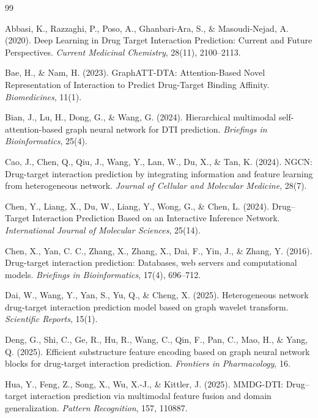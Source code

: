 \documentclass[12pt,a4paper,oneside]{report}
\begin{document}
\begin{thebibliography}{99}

Abbasi, K., Razzaghi, P., Poso, A., Ghanbari-Ara, S., \& Masoudi-Nejad, A. (2020).
Deep Learning in Drug Target Interaction Prediction: Current and Future Perspectives.
\textit{Current Medicinal Chemistry}, 28(11), 2100--2113.

Bae, H., \& Nam, H. (2023).
GraphATT-DTA: Attention-Based Novel Representation of Interaction to Predict Drug-Target Binding Affinity.
\textit{Biomedicines}, 11(1).

Bian, J., Lu, H., Dong, G., \& Wang, G. (2024).
Hierarchical multimodal self-attention-based graph neural network for DTI prediction.
\textit{Briefings in Bioinformatics}, 25(4).

Cao, J., Chen, Q., Qiu, J., Wang, Y., Lan, W., Du, X., \& Tan, K. (2024).
NGCN: Drug-target interaction prediction by integrating information and feature learning from heterogeneous network.
\textit{Journal of Cellular and Molecular Medicine}, 28(7).

Chen, Y., Liang, X., Du, W., Liang, Y., Wong, G., \& Chen, L. (2024).
Drug–Target Interaction Prediction Based on an Interactive Inference Network.
\textit{International Journal of Molecular Sciences}, 25(14).

Chen, X., Yan, C. C., Zhang, X., Zhang, X., Dai, F., Yin, J., \& Zhang, Y. (2016).
Drug-target interaction prediction: Databases, web servers and computational models.
\textit{Briefings in Bioinformatics}, 17(4), 696--712.

Dai, W., Wang, Y., Yan, S., Yu, Q., \& Cheng, X. (2025).
Heterogeneous network drug-target interaction prediction model based on graph wavelet transform.
\textit{Scientific Reports}, 15(1).

Deng, G., Shi, C., Ge, R., Hu, R., Wang, C., Qin, F., Pan, C., Mao, H., \& Yang, Q. (2025).
Efficient substructure feature encoding based on graph neural network blocks for drug-target interaction prediction.
\textit{Frontiers in Pharmacology}, 16.

Hua, Y., Feng, Z., Song, X., Wu, X.-J., \& Kittler, J. (2025).
MMDG-DTI: Drug–target interaction prediction via multimodal feature fusion and domain generalization.
\textit{Pattern Recognition}, 157, 110887.


\end{thebibliography}
\end{document}
